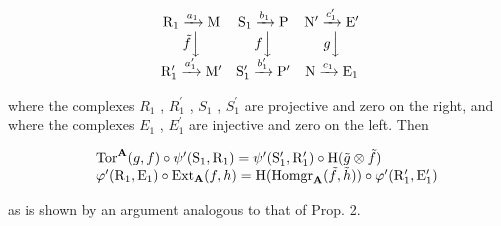 \[
\begin{array}{c c c} \mathrm{R} _ {1} \xrightarrow {a _ {1}} \mathrm{M} & \mathrm{S} _ {1} \xrightarrow {b _ {1}} \mathrm{P} & \mathrm{N} ^ {\prime} \xrightarrow {c _ {1} ^ {\prime}} \mathrm{E} ^ {\prime} \\ \tilde {f} \Big \downarrow & f \Big \downarrow & g \Big \downarrow \\ \mathrm{R} _ {1} ^ {\prime} \xrightarrow {a _ {1} ^ {\prime}} \mathrm{M} ^ {\prime} & \mathrm{S} _ {1} ^ {\prime} \xrightarrow {b _ {1} ^ {\prime}} \mathrm{P} ^ {\prime} & \mathrm{N} \xrightarrow {c _ {1}} \mathrm{E} _ {1} \end{array}
\]

where the complexes \(R_{1}\) , \(R_{1}^{\prime}\) , \(S_{1}\) , \(S_{1}^{\prime}\) are projective and zero on the right, and where the complexes \(E_{1}\) , \(E_{1}^{\prime}\) are injective and zero on the left. Then

\[
\begin{array}{r l} & {\mathrm{Tor} ^ {\mathbf {A}} (g, f) \circ \psi^ {\prime} (\mathrm{S} _ {1}, \mathrm{R} _ {1}) = \psi^ {\prime} (\mathrm{S} _ {1} ^ {\prime}, \mathrm{R} _ {1} ^ {\prime}) \circ \mathrm{H} (\tilde {g} \otimes \tilde {f})} \\ & {\varphi^ {\prime} (\mathrm{R} _ {1}, \mathrm{E} _ {1}) \circ \mathrm{Ext} _ {\mathbf {A}} (f, h) = \mathrm{H} (\mathrm{Homgr} _ {\mathbf {A}} (\tilde {f}, \tilde {h})) \circ \varphi^ {\prime} (\mathrm{R} _ {1} ^ {\prime}, \mathrm{E} _ {1} ^ {\prime})} \end{array}
\]

as is shown by an argument analogous to that of Prop. 2.

